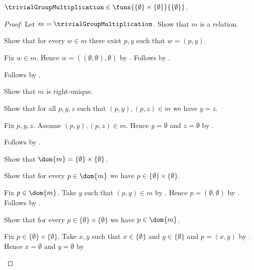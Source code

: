 \begin{proposition}\label{trivial_group_multiplication_type}
    $\trivialGroupMultiplication\in
        \funs{\{\emptyset\}\times\{\emptyset\}}{\{\emptyset\}}$.
\end{proposition}
\begin{proof}
    Let $m=\trivialGroupMultiplication$.
    Show that $m$ is a relation.
    \begin{subproof}
        Show that for every $w\in m$ there exist $p,y$ such that
            $w=(p,y)$.
        \begin{subproof}
            Fix $w\in m$.
            Hence $w=((\emptyset,\emptyset),\emptyset)$ by
                .
            Follows by \auto.
        \end{subproof}
        Follows by .
    \end{subproof}
    Show that $m$ is right-unique.
    \begin{subproof}
        Show that for all $p,y,z$ such that $(p,y),(p,z)\in m$
            we have $y=z$.
        \begin{subproof}
            Fix $p,y,z$.
            Assume $(p,y),(p,z)\in m$.
            Hence $y=\emptyset$ and $z=\emptyset$ by
                .
        \end{subproof}
        Follows by .
    \end{subproof}
    Show that $\dom{m}=\{\emptyset\}\times\{\emptyset\}$.
    \begin{subproof}
        Show that for every $p\in\dom{m}$ we have
            $p\in\{\emptyset\}\times\{\emptyset\}$.
        \begin{subproof}
            Fix $p\in\dom{m}$.
            Take $y$ such that $(p,y)\in m$ by .
            Hence $p=(\emptyset,\emptyset)$ by
                .
            Follows by .
        \end{subproof}
        Show that for every
            $p\in\{\emptyset\}\times\{\emptyset\}$ we have
            $p\in\dom{m}$.
        \begin{subproof}
            Fix $p\in\{\emptyset\}\times\{\emptyset\}$.
            Take $x,y$ such that $x\in\{\emptyset\}$ and
                $y\in\{\emptyset\}$ and $p=(x,y)$ by
                .
            Hence $x=\emptyset$ and $y=\emptyset$ by

\end{subproof}
\end{subproof}
\end{proof}
